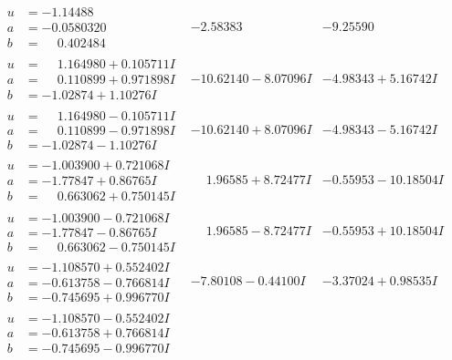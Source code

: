 \documentclass[1p]{elsarticle_modified}
\theoremstyle{definition}
\begin{document}
$$\begin{array}{c|c|c}
\begin{aligned}
u &= -1.14488\phantom{ +0.000000I} \\
a &= -0.0580320\phantom{ +0.000000I} \\
b &= \phantom{-}0.402484\phantom{ +0.000000I}\end{aligned}
 & -2.58383\phantom{ +0.000000I} & -9.25590\phantom{ +0.000000I} \\ \hline\begin{aligned}
u &= \phantom{-}1.164980 + 0.105711 I \\
a &= \phantom{-}0.110899 + 0.971898 I \\
b &= -1.02874 + 1.10276 I\end{aligned}
 & -10.62140 - 8.07096 I & -4.98343 + 5.16742 I \\ \hline\begin{aligned}
u &= \phantom{-}1.164980 - 0.105711 I \\
a &= \phantom{-}0.110899 - 0.971898 I \\
b &= -1.02874 - 1.10276 I\end{aligned}
 & -10.62140 + 8.07096 I & -4.98343 - 5.16742 I \\ \hline\begin{aligned}
u &= -1.003900 + 0.721068 I \\
a &= -1.77847 + 0.86765 I \\
b &= \phantom{-}0.663062 + 0.750145 I\end{aligned}
 & \phantom{-}1.96585 + 8.72477 I & -0.55953 - 10.18504 I \\ \hline\begin{aligned}
u &= -1.003900 - 0.721068 I \\
a &= -1.77847 - 0.86765 I \\
b &= \phantom{-}0.663062 - 0.750145 I\end{aligned}
 & \phantom{-}1.96585 - 8.72477 I & -0.55953 + 10.18504 I \\ \hline\begin{aligned}
u &= -1.108570 + 0.552402 I \\
a &= -0.613758 - 0.766814 I \\
b &= -0.745695 + 0.996770 I\end{aligned}
 & -7.80108 - 0.44100 I & -3.37024 + 0.98535 I \\ \hline\begin{aligned}
u &= -1.108570 - 0.552402 I \\
a &= -0.613758 + 0.766814 I \\
b &= -0.745695 - 0.996770 I\end{aligned}

\end{array}$$
\end{document}
